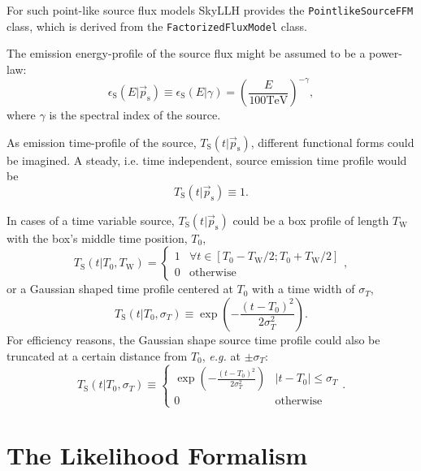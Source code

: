 \documentclass{article}
\newcommand{\code}[1]{\texttt{#1}}
\newcommand{\class}[1]{\colorbox{blue!30}{\code{#1}}}
\newcommand{\ps}{\vec{p}_{\mathrm{s}}}
\begin{document}
For such point-like source flux models SkyLLH provides the
\class{PointlikeSourceFFM} class, which is derived from the \class{FactorizedFluxModel}
class.

The emission energy-profile of the source flux might be assumed to be a power-law:
\begin{equation}
 \epsilon_{\mathrm{S}}(E|\ps) \equiv \epsilon_{\mathrm{S}}(E|\gamma) = \left(\frac{E}{100\mathrm{TeV}}\right)^{-\gamma},
\end{equation}
where $\gamma$ is the spectral index of the source.

As emission time-profile of the source, $T_{\mathrm{S}}(t|\ps)$, different functional
forms could be imagined.
A steady, i.e. time independent, source emission time profile would be
\begin{equation}
 T_{\mathrm{S}}(t|\ps) \equiv 1.
\end{equation}

In cases of a time variable source, $T_{\mathrm{S}}(t|\ps)$ could be a box
profile of length $T_{\mathrm{W}}$ with the box's middle time position, $T_{0}$,
\begin{equation}
 T_{\mathrm{S}}(t|T_0,T_{\mathrm{W}}) =
   \begin{cases}
     1 & \forall t \in \left[T_0 - T_{\mathrm{W}}/2; T_0 + T_{\mathrm{W}}/2 \right]\\
     0 & \mathrm{otherwise}
   \end{cases},
 \label{eq:Ts-box}
\end{equation}
or a Gaussian shaped time profile centered at $T_0$ with a time width of $\sigma_T$,
\begin{equation}
 T_{\mathrm{S}}(t|T_0,\sigma_T) \equiv \exp\left(-\frac{(t - T_0)^2}{2\sigma_T^2}\right).
 \label{eq:Ts-gauss-non-truncated}
\end{equation}
For efficiency reasons, the Gaussian shape source time profile could also be
truncated at a certain distance from $T_0$, \emph{e.g.} at $\pm\sigma_T$:
\begin{equation}
 T_{\mathrm{S}}(t|T_0,\sigma_T) \equiv
   \begin{cases}
     \exp\left(-\frac{(t - T_0)^2}{2\sigma_T^2}\right) & \left|t-T_0\right| \le \sigma_T\\
     0 & \mathrm{otherwise}
   \end{cases}.
 \label{eq:Ts-gauss-truncated}
\end{equation}


\section{The Likelihood Formalism}
\end{document}
